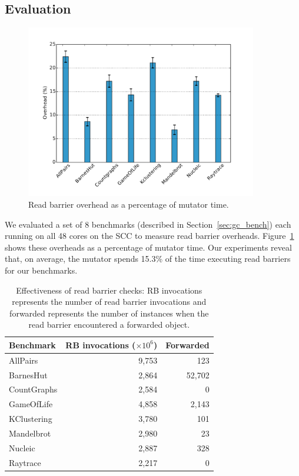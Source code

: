 \subsection{Evaluation}

\begin{figure}
  \centering
  \includegraphics[width=0.9\textwidth]{Graphs/RB_overhead}
  \caption{Read barrier overhead as a percentage of mutator time.}
  \label{fig:rb-overhead}
\end{figure}

We evaluated a set of 8 benchmarks (described in Section~\ref{sec:gc_bench})
each running on all 48 cores on the SCC to measure read barrier overheads.
Figure~\ref{fig:rb-overhead} shows these overheads as a percentage of mutator
time. Our experiments reveal that, on average, the mutator spends 15.3\% of the
time executing read barriers for our benchmarks.

\begin{table}[hbt]
\begin{center}
\begin{tabular} {l r r}
\hline
{\bf Benchmark} & {\bf RB invocations ($\times 10^6$)} & {\bf Forwarded}\\
\hline
{AllPairs} & 9,753 & 123 \\
{BarnesHut} & 2,864 & 52,702 \\
{CountGraphs} & 2,584 & 0 \\
{GameOfLife} & 4,858 & 2,143 \\
{KClustering} & 3,780 & 101 \\
{Mandelbrot} & 2,980 & 23 \\
{Nucleic} & 2,887 & 328 \\
{Raytrace} & 2,217 & 0 \\
\hline
\end{tabular}
\end{center}
\caption{Effectiveness of read barrier checks: RB invocations represents the number of
read barrier invocations and forwarded represents the number of instances when
the read barrier encountered a forwarded object.}
\label{tab:rb_utility}
\end{table}

